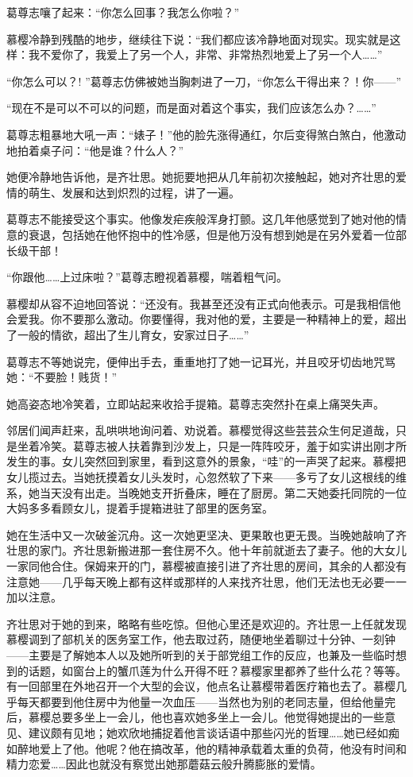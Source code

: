 \par 葛尊志嚷了起来：“你怎么回事？我怎么你啦？”
\par 慕樱冷静到残酷的地步，继续往下说：“我们都应该冷静地面对现实。现实就是这样：我不爱你了，我爱上了另一个人，非常、非常热烈地爱上了另一个人……”
\par “你怎么可以？! ”葛尊志仿佛被她当胸刺进了一刀，“你怎么干得出来？！你——”
\par “现在不是可以不可以的问题，而是面对着这个事实，我们应该怎么办？……”
\par 葛尊志粗暴地大吼一声：“婊子！”他的脸先涨得通红，尔后变得煞白煞白，他激动地拍着桌子问：“他是谁？什么人？”
\par 她便冷静地告诉他，是齐壮思。她扼要地把从几年前初次接触起，她对齐壮思的爱情的萌生、发展和达到炽烈的过程，讲了一遍。
\par 葛尊志不能接受这个事实。他像发疟疾般浑身打颤。这几年他感觉到了她对他的情意的衰退，包括她在他怀抱中的性冷感，但是他万没有想到她是在另外爱着一位部长级干部！
\par “你跟他……上过床啦？”葛尊志瞪视着慕樱，喘着粗气问。
\par 慕樱却从容不迫地回答说：“还没有。我甚至还没有正式向他表示。可是我相信他会爱我。你不要那么激动。你要懂得，我对他的爱，主要是一种精神上的爱，超出了一般的情欲，超出了生儿育女，安家过日子……”
\par 葛尊志不等她说完，便伸出手去，重重地打了她一记耳光，并且咬牙切齿地咒骂她：“不要脸！贱货！”
\par 她高姿态地冷笑着，立即站起来收拾手提箱。葛尊志突然扑在桌上痛哭失声。
\par 邻居们闻声赶来，乱哄哄地询问着、劝说着。慕樱觉得这些芸芸众生何足道哉，只是坐着冷笑。葛尊志被人扶着靠到沙发上，只是一阵阵咬牙，羞于如实讲出刚才所发生的事。女儿突然回到家里，看到这意外的景象，“哇”的一声哭了起来。慕樱把女儿揽过去。当她抚摸着女儿头发时，心忽然软了下来——多亏了女儿这根线的维系，她当天没有出走。当晚她支开折叠床，睡在了厨房。第二天她委托同院的一位大妈多多看顾女儿，提着手提箱进驻了部里的医务室。
\par 她在生活中又一次破釜沉舟。这一次她更坚决、更果敢也更无畏。当晚她敲响了齐壮思的家门。齐壮思新搬进那一套住房不久。他十年前就逝去了妻子。他的大女儿一家同他合住。保姆来开的门，慕樱被直接引进了齐壮思的房间，其余的人都没有注意她——几乎每天晚上都有这样或那样的人来找齐壮思，他们无法也无必要一一加以注意。
\par 齐壮思对于她的到来，略略有些吃惊。但他心里还是欢迎的。齐壮思一上任就发现慕樱调到了部机关的医务室工作，他去取过药，随便地坐着聊过十分钟、一刻钟——主要是了解她本人以及她所听到的关于部党组工作的反应，也兼及一些临时想到的话题，如窗台上的蟹爪莲为什么开得不旺？慕樱家里都养了些什么花？等等。有一回部里在外地召开一个大型的会议，他点名让慕樱带着医疗箱也去了。慕樱几乎每天都要到他住房中为他量一次血压——当然也为别的老同志量，但给他量完后，慕樱总要多坐上一会儿，他也喜欢她多坐上一会儿。他觉得她提出的一些意见、建议颇有见地；她欢欣地捕捉着他言谈话语中那些闪光的哲理……她已经如痴如醉地爱上了他。他呢？他在搞改革，他的精神承载着太重的负荷，他没有时间和精力恋爱……因此也就没有察觉出她那蘑菇云般升腾膨胀的爱情。

